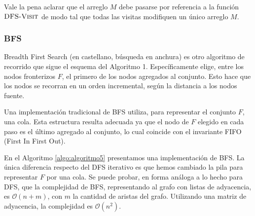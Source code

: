 Vale la pena aclarar que el arreglo $M$ debe pasarse por referencia a la función $\textsc{DFS-Visit}$ de modo tal que todas las visitas modifiquen un único arreglo $M$.

\subsubsection{BFS}
Breadth First Search (en castellano, búsqueda en anchura) es otro algoritmo de recorrido que sigue el esquema del Algoritmo 1. Específicamente elige, entre los nodos fronterizos $F$, el primero de los nodos agregados al conjunto. Esto hace que los nodos se recorran en un orden incremental, según la distancia a los nodos fuente.

Una implementación tradicional de BFS utiliza, para representar el conjunto $F$, una cola. Esta estructura resulta adecuada ya que el nodo de $F$ elegido en cada paso es el último agregado al conjunto, lo cual coincide con el invariante FIFO (First In First Out).

En el Algoritmo \ref{algo:algoritmo5} presentamos una implementación de BFS. La única diferencia respecto del DFS iterativo es que hemos cambiado la pila para representar $F$ por una cola. Se puede probar, en forma análoga a lo hecho para DFS, que la complejidad de BFS, representando al grafo con listas de adyacencia, es $\mathcal{O}(n + m)$, con $m$ la cantidad de aristas del grafo. Utilizando una matriz de adyacencia, la complejidad es $\mathcal{O}(n^2)$.

\begin{algorithm}
	\dontprintsemicolon
 	\BlankLine
\caption{$\textsc{BFS}$}
\label{algo:algoritmo5}
\end{algorithm}
